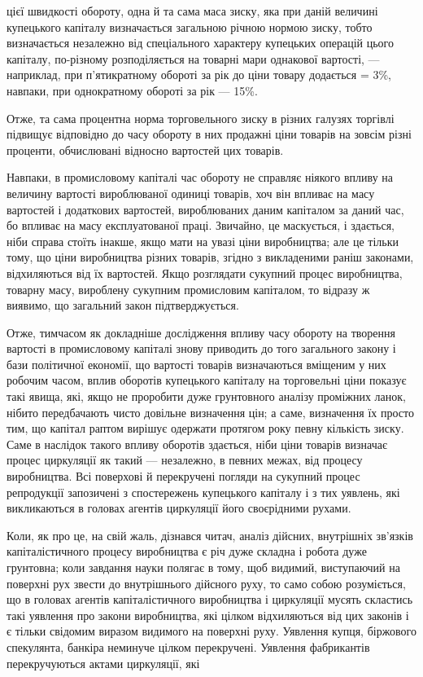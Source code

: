 \parcont{}  %
цієї швидкості обороту, одна й та сама маса зиску, яка при даній
величині купецького капіталу визначається загальною річною
нормою зиску, тобто визначається незалежно від спеціального
характеру купецьких операцій цього капіталу, по-різному розподіляється
на товарні мари однакової вартості, — наприклад, при п’ятикратному
обороті за рік до ціни товару додається  = 3\%,
навпаки, при однократному обороті за рік — 15\%.

Отже, та сама процентна норма торговельного зиску в різних
галузях торгівлі підвищує відповідно до часу обороту в них
продажні ціни товарів на зовсім різні проценти, обчислювані
відносно вартостей цих товарів.

Навпаки, в промисловому капіталі час обороту не справляє
ніякого впливу на величину вартості вироблюваної одиниці товарів,
хоч він впливає на масу вартостей і додаткових вартостей,
вироблюваних даним капіталом за даний час, бо впливає на
масу експлуатованої праці. Звичайно, це маскується, і здається,
ніби справа стоїть інакше, якщо мати на увазі ціни виробництва;
але це тільки тому, що ціни виробництва різних товарів, згідно
з викладеними раніш законами, відхиляються від їх вартостей.
Якщо розглядати сукупний процес виробництва, товарну масу,
вироблену сукупним промисловим капіталом, то відразу ж виявимо,
що загальний закон підтверджується.

Отже, тимчасом як докладніше дослідження впливу часу
обороту на творення вартості в промисловому капіталі знову
приводить до того загального закону і бази політичної економії,
що вартості товарів визначаються вміщеним у них робочим
часом, вплив оборотів купецького капіталу на торговельні ціни
показує такі явища, які, якщо не проробити дуже грунтовного аналізу
проміжних ланок, нібито передбачають чисто довільне визначення
цін; а саме, визначення їх просто тим, що капітал раптом
вирішує одержати протягом року певну кількість зиску. Саме
в наслідок такого впливу оборотів здається, ніби ціни товарів
визначає процес циркуляції як такий — незалежно, в певних межах,
від процесу виробництва. Всі поверхові й перекручені
погляди на сукупний процес репродукції запозичені з спостережень
купецького капіталу і з тих уявлень, які викликаються
в головах агентів циркуляції його своєрідними рухами.

Коли, як про це, на свій жаль, дізнався читач, аналіз дійсних,
внутрішніх зв’язків капіталістичного процесу виробництва є
річ дуже складна і робота дуже грунтовна; коли завдання
науки полягає в тому, щоб видимий, виступаючий на поверхні
рух звести до внутрішнього дійсного руху, то само собою
розуміється, що в головах агентів капіталістичного виробництва
і циркуляції мусять скластись такі уявлення про закони виробництва,
які цілком відхиляються від цих законів і є тільки свідомим
виразом видимого на поверхні руху. Уявлення купця,
біржового спекулянта, банкіра неминуче цілком перекручені.
Уявлення фабрикантів перекручуються актами циркуляції, які
\parbreak{}  %
